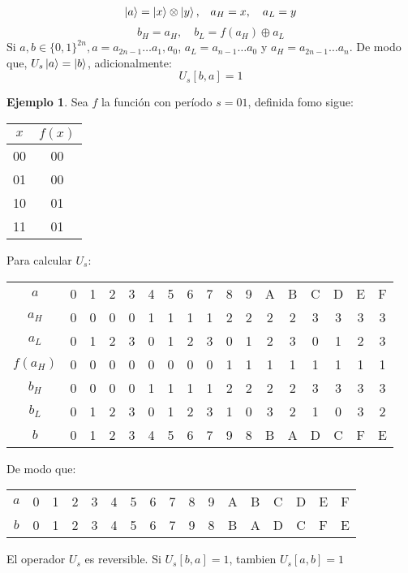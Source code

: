 \documentclass{article}
\theoremstyle{definition}
\newtheorem{ejemplo}{Ejemplo}[section]
\begin{document}
%
%

$$
\begin{aligned}
	\ket{a} = \ket{x}\otimes\ket{y},& \quad a_H = x, \quad a_L = y \\
\end{aligned}
$$
$$ b_H = a_H, \quad b_L = f(a_H) \oplus a_L $$
Si $a,b \in \{0,1\}^{2n}, a = a_{2n-1} \ldots a_1, a_0 $, $a_L = a_{n-1} \ldots 
a_0$ y $a_H = a_{2n-1} \ldots a_n$.
De modo que, $U_s\ket{a} = \ket{b}$, adicionalmente:
$$
	U_s[b, a] = 1
$$

\begin{ejemplo}
Sea $f$ la función con período $s=01$, definida fomo sigue:
\begin{tabular}{|c|c|}
	\hline
	$x$ & $f(x)$ \\\hline
	00 & 00 \\
	01 & 00 \\
	10 & 01 \\
	11 & 01 \\\hline
\end{tabular}

Para calcular $U_s$:

\begin{tabular}{|c|cccc|cccc|cccc|cccc|}
	\hline
	$a$     &0&1&2&3& 4&5&6&7& 8&9&A&B &C&D&E&F \\
	$a_H$   &0&0&0&0& 1&1&1&1& 2&2&2&2 &3&3&3&3 \\
	$a_L$   &0&1&2&3& 0&1&2&3& 0&1&2&3 &0&1&2&3 \\
	$f(a_H)$&0&0&0&0& 0&0&0&0& 1&1&1&1 &1&1&1&1 \\
	$b_H$   &0&0&0&0& 1&1&1&1& 2&2&2&2 &3&3&3&3 \\
	$b_L$   &0&1&2&3& 0&1&2&3& 1&0&3&2 &1&0&3&2 \\
	$b$     &0&1&2&3& 4&5&6&7& 9&8&B&A &D&C&F&E \\
	\hline
\end{tabular}

De modo que:

\begin{tabular}{|c|cccc|cccc|cccc|cccc|}
	\hline
	$a$     &0&1&2&3& 4&5&6&7& 8&9&A&B &C&D&E&F \\
	$b$     &0&1&2&3& 4&5&6&7& 9&8&B&A &D&C&F&E \\
	\hline
\end{tabular}

El operador $U_s$ es reversible.
Si $U_s[b,a] = 1$, tambien $U_s[a,b] = 1$



\end{ejemplo}
\end{document}
